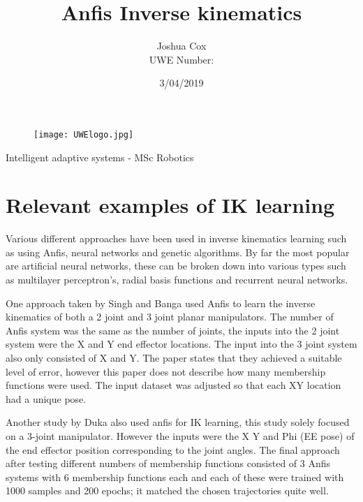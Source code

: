 \documentclass[a4paper,11pt]{article}
\begin{document}
\begin{titlepage}

\begin{figure}[!t]
  \texttt{[image: UWElogo.jpg]}
\end{figure}

\title{Anfis Inverse kinematics} %

\author{Joshua Cox \\
UWE Number: }
\date{3/04/2019}

\maketitle
\center \large Intelligent adaptive systems - MSc Robotics
\end{titlepage}




\section{Relevant examples of IK learning}
Various different approaches have been used in inverse kinematics learning such as using Anfis, neural networks and genetic algorithms. By far the most popular are artificial neural networks, these can be broken down into various types such as multilayer perceptron’s, radial basis functions and recurrent neural networks.

One approach taken by Singh and Banga \cite{anfis1} used Anfis to learn the inverse kinematics of both a 2 joint and 3 joint planar manipulators. The number of Anfis system was the same as the number of joints, the inputs into the 2 joint system were the X and Y end effector locations. The input into the 3 joint system also only consisted of X and Y. The paper states that they achieved a suitable level of error, however this paper does not describe how many membership functions were used. The input dataset was adjusted so that each XY location had a unique pose.

Another study by Duka \cite{anfis2} also used anfis for IK learning, this study solely focused on a 3-joint manipulator. However the inputs were the X Y and Phi (EE pose) of the end effector position corresponding to the joint angles. The final approach after testing different numbers of membership functions consisted of 3 Anfis systems with 6 membership functions each and each of these were trained with 1000 samples and 200 epochs; it matched the chosen trajectories quite well. %
\end{document}
